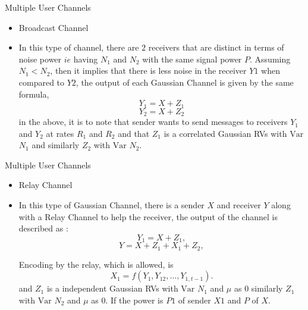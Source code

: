 \documentclass{beamer}
\begin{document}
\begin{frame}{Multiple User Channels}
 \begin{itemize}
	\justifying
\item    Broadcast Channel 
\item In this type of channel, there are $2$ receivers that are distinct in terms of noise power $ie$ having \( N_1 \) and \( N_2 \) with the same signal power  \( P \). Assuming \( N_1 < N_2 \), then it implies that there is less noise in the receiver $Y1$ when compared to $Y2$, the output of each Gaussian Channel is given by the same formula,
\begin{equation}
Y_1 = X + Z_1  
\end{equation}
\begin{equation}
Y_2 = X + Z_2  
\end{equation}
in the above, it is to note that sender wants to send messages to receivers \( Y_1 \) and \( Y_2 \) at rates \( R_1 \) and \( R_2 \) and that  \( Z_1 \) is a correlated Gaussian RVs with $\mathrm{Var}$ \( N_1 \) and similarly  \( Z_2 \) with $\mathrm{Var}$ \( N_2 \).




	\end{itemize}
\end{frame}
\begin{frame}{Multiple User Channels}
 \begin{itemize}
	\justifying
\item    Relay Channel 
\item In this type of Gaussian Channel, there is a sender $X$ and receiver \( Y \) along with a Relay Channel to help the receiver, the output of the channel is described as :
\begin{equation}
Y_1 = X + Z_1,
\end{equation}
\begin{equation}
Y = X + Z_1 + X_1 + Z_2,
\end{equation}

Encoding by the relay, which is allowed, is 
\begin{equation}
X_1 = f(Y_1, Y_{12}, \ldots, Y_{1, t-1}).
\end{equation} 
and \( Z_1 \) is a independent Gaussian RVs with $\mathrm{Var}$ \( N_1 \) and
$\mu$ as $0$ similarly  \( Z_1 \) with $\mathrm{Var}$ \( N_2 \)  and $\mu$ as $0$.
If the power is $P1$ of sender $X1$ and $P$ of $X$.




	\end{itemize}
\end{frame}
\end{document}
